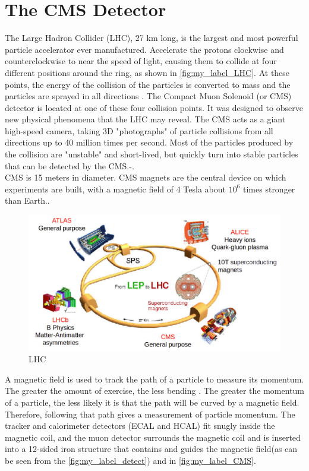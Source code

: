 \chapter{\label{CMS}The CMS Detector}
The  Large Hadron Collider (LHC), 27 km long, is the largest and most powerful particle accelerator ever manufactured. Accelerate the protons  clockwise and counterclockwise to near the speed of light, causing them to collide at four different positions around the ring, as shown in \autoref{fig:my_label_LHC}. At these points, the energy of the collision of the particles is converted to mass and the particles are sprayed in all directions \cite{CMS_1}. The Compact Muon Solenoid (or CMS) detector is located at one of these four collision points. It was designed to observe  new physical phenomena that the LHC may reveal. The CMS acts as a giant high-speed camera, taking 3D "photographs" of particle collisions from all directions up to 40 million times per second. Most of the particles produced by the collision are "unstable" and short-lived, but quickly turn into stable particles that can be detected by the CMS.\cite{CMS_1}-\cite{CMS:2008xjf}.\\
 CMS is 15 meters in diameter. CMS magnets are the central device on which experiments are built, with a magnetic field of 4 Tesla about $10^6$ times stronger than Earth.\cite{CMS:2008xjf}\cite{CMS_2}.
 \begin{figure}[H]
     \centering
     \includegraphics[scale=0.3]{Detector/14__ml.png}
     \caption{LHC}
     \label{fig:my_label_LHC}
 \end{figure}
A magnetic field is used to track the path of a particle to measure its momentum. The greater the amount of exercise, the less bending \cite{CMS_1}. The greater the momentum of a particle, the less likely it is that the  path will be curved by a magnetic field. Therefore, following that path gives a measurement of particle momentum. The tracker and calorimeter detectors (ECAL and HCAL) fit snugly inside the magnetic coil, and the muon detector surrounds the magnetic coil and is inserted into a 12-sided iron structure that  contains and guides the magnetic field(as can be seen from the \autoref{fig:my_label_detect})\cite{CMS_2} and in \autoref{fig:my_label_CMS}.
